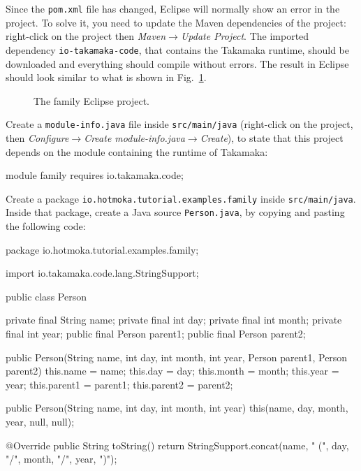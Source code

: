 Since the \texttt{pom.xml} file has changed, Eclipse will normally show an error
in the project. To solve it,
you need to update the Maven dependencies of the project:
right-click on the project then \emph{Maven}$\rightarrow$\emph{Update Project}.
The imported dependency \texttt{io-takamaka-code},
that contains the Takamaka runtime, should be downloaded
and everything should compile without errors.
The result in Eclipse should look similar to what is
shown in Fig.~\ref{fig:family}.
%
\begin{figure}[t]
  \begin{center}
  \end{center}
  \caption{The family Eclipse project.}
  \label{fig:family}
\end{figure}

Create a \texttt{module-info.java} file inside \texttt{src/main/java}
(right-click on the project, then \emph{Configure}$\rightarrow$\emph{Create module-info.java}$\rightarrow$\emph{Create}),
to state that this project depends on the module containing the runtime of Takamaka:
%
\begin{codebox}\begin{javalst}
module family {
  requires io.takamaka.code;
}
\end{javalst}\end{codebox}

Create a package \texttt{io.hotmoka.tutorial.examples.family}
inside \texttt{src/main/java}. Inside that package,
create a Java source \texttt{Person.java}, by copying and pasting the following code:
%
\begin{codebox}\begin{javalst}
package io.hotmoka.tutorial.examples.family;

import io.takamaka.code.lang.StringSupport;

public class Person {
  private final String name;
  private final int day;
  private final int month;
  private final int year;
  public final Person parent1;
  public final Person parent2;

  public Person(String name, int day, int month, int year, Person parent1, Person parent2) {
    this.name = name;
    this.day = day;
    this.month = month;
    this.year = year;
    this.parent1 = parent1;
    this.parent2 = parent2;
  }

  public Person(String name, int day, int month, int year) {
    this(name, day, month, year, null, null);
  }

  @Override
  public String toString() {
    return StringSupport.concat(name, " (", day, "/", month, "/", year, ")");
  }
}
\end{javalst}\end{codebox}

